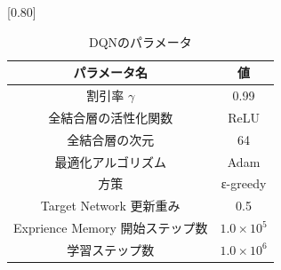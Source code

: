 \documentclass[twocolumn]{jarticle}
\begin{document}
  \begin{table}[t]
    \centering
    \caption{DQNのパラメータ}
    \vspace{-0.3cm}
    \label{table:dqnparam}
    \scalebox{0.80}[0.80]{
      \begin{tabular}{|c|c|}
        \hline
        パラメータ名 & 値 \\ \hline \hline
        割引率 $\gamma$ & 0.99 \\ \hline     
        全結合層の活性化関数             & ReLU     \\ \hline
        全結合層の次元                & 64       \\ \hline
        最適化アルゴリズム              & Adam     \\ \hline
        方策                 & ε-greedy \\ \hline
        Target Network 更新重み              & 0.5     \\ \hline
        Exprience Memory 開始ステップ数 & $1.0 \times 10^5$ \\ \hline
        学習ステップ数 &  $1.0 \times 10^6$ \\ \hline
        \end{tabular}
    }
    \end{table}
  
\end{document}
